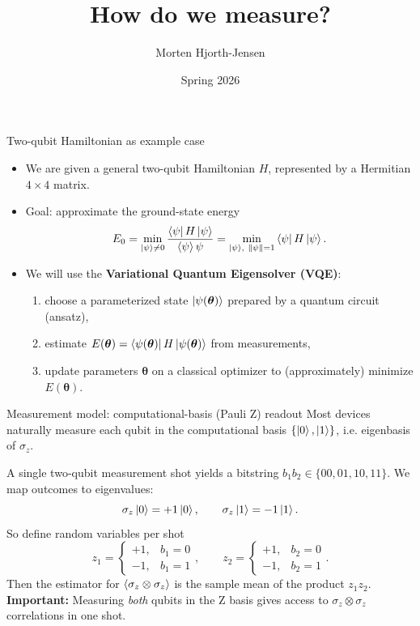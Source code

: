 \documentclass[aspectratio=169]{beamer}
\title[VQE for a Two-Qubit Hamiltonian]{How do we measure?}
\author{Morten Hjorth-Jensen}
\date{Spring 2026}
\newcommand{\Z}{\sigma_z}
\begin{document}
\begin{frame}
\titlepage
\end{frame}

\begin{frame}{Two-qubit Hamiltonian as example case}
\begin{itemize}
  \item We are given a general two-qubit Hamiltonian \(H\), represented by a Hermitian \(4\times 4\) matrix.
  \item Goal: approximate the ground-state energy
  \[
    E_0 = \min_{\ket{\psi}\neq 0}\frac{\bra{\psi}H\ket{\psi}}{\braket{\psi}{\psi}}
    = \min_{\ket{\psi}, \ \|\psi\|=1} \bra{\psi}H\ket{\psi}.
  \]
  \item We will use the \textbf{Variational Quantum Eigensolver (VQE)}:
  \begin{enumerate}
    \item choose a parameterized state \(\ket{\psi(\bm{\theta})}\) prepared by a quantum circuit (ansatz),
    \item estimate \(E(\bm{\theta})=\bra{\psi(\bm{\theta})}H\ket{\psi(\bm{\theta})}\) from measurements,
    \item update parameters \(\bm{\theta}\) on a classical optimizer to (approximately) minimize \(E(\bm{\theta})\).
  \end{enumerate}
\end{itemize}
\end{frame}

\begin{frame}{Measurement model: computational-basis (Pauli Z) readout}
Most devices naturally measure each qubit in the computational basis
\(\{\ket{0},\ket{1}\}\), i.e. eigenbasis of \(\Z\).

\medskip
A single two-qubit measurement shot yields a bitstring \(b_1 b_2\in\{00,01,10,11\}\).
We map outcomes to eigenvalues:
\[
\Z\ket{0}=+1\ket{0},\qquad \Z\ket{1}=-1\ket{1}.
\]
So define random variables per shot
\[
z_1 = \begin{cases}+1,& b_1=0\\-1,& b_1=1\end{cases},
\qquad
z_2 = \begin{cases}+1,& b_2=0\\-1,& b_2=1\end{cases}.
\]
Then the estimator for \(\expval{\Z\otimes\Z}\) is the sample mean of the product \(z_1 z_2\).
\textbf{Important:} Measuring \emph{both} qubits in the Z basis gives access to \(\Z\otimes \Z\) correlations in one shot.
\end{frame}
\end{document}
